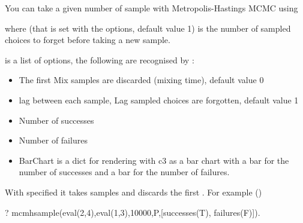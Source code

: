 \documentclass[letterpaper,10pt,english]{sphinxmanual}
\begin{document}
You can take a given number of sample with Metropolis-Hastings MCMC using

\begin{sphinxVerbatim}[commandchars=\\\{\}]
  
\end{sphinxVerbatim}

where  (that is set with the options, default value 1) is the number of sampled choices to forget before taking a new sample.

 is a list of options, the following are recognised by :
\begin{itemize}
\item {} 
 The first Mix samples are discarded (mixing time), default value 0

\item {} 
 lag between each sample, Lag sampled choices are forgotten, default value 1

\item {} 
 Number of successes

\item {} 
 Number of failures

\item {} 
 BarChart is a dict for rendering with c3 as a bar chart with a bar for the number of successes and a bar for the number of failures.

\end{itemize}

With  specified it takes  samples and discards the first .
For example ()

\begin{sphinxVerbatim}[commandchars=\\\{\}]
?\PYGZhy{} mc\PYGZus{}mh\PYGZus{}sample(eval(2,4),eval(1,3),10000,P,[successes(T), failures(F)]).
\end{sphinxVerbatim}
\end{document}
